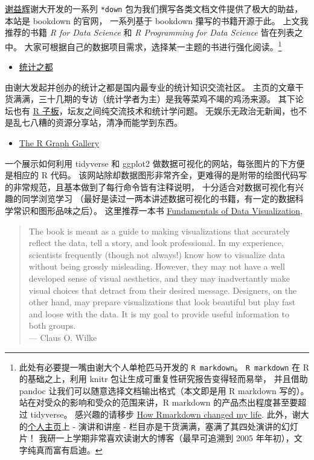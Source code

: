 \documentclass[11pt,hyperref]{ctexart}
\providecommand{\tightlist}{%
  \setlength{\itemsep}{0pt}\setlength{\parskip}{0pt}}
\begin{document}
\href{https://yihui.org/}{谢益辉}谢大开发的一系列 \texttt{*down}
包为我们撰写各类文档文件提供了极大的助益，本站是 bookdown 的官网，
一系列基于 bookdown 攥写的书籍开源于此。 上文我推荐的书籍 \emph{R for
Data Science} 和 \emph{R Programming for Data Science} 皆在列表之中。
大家可根据自己的数据项目需求，选择某一主题的书进行强化阅读。\footnote{此处有必要提一嘴由谢大个人单枪匹马开发的
  \texttt{R\ markdown}。 \texttt{R\ markdown} 在 R 的基础之上，利用
  knitr 包让生成可重复性研究报告变得轻而易举， 并且借助 pandoc
  让我们可以随意选择文档输出格式（本文即是用 R markdown 写的）。
  站在对受众的影响和受众的范围来讲，R markdown 的产品杰出程度甚至要超过
  tidyverse。 感兴趣的请移步
  \href{https://robjhyndman.com/seminars/rmarkdown/}{How Rmarkdown
  changed my life}. 此外，谢大的\href{https://yihui.org/}{个人主页}上 -
  演讲和讲座 - 栏目亦是干货满满，塞满了其四处演讲的幻灯片！
  我研一上学期非常喜欢读谢大的博客（最早可追溯到 2005
  年年初），文字纯真而富有启迪。}

\begin{itemize}
\tightlist
\item
  \href{https://cosx.org/}{统计之都}
\end{itemize}

由谢大发起并创办的统计之都是国内最专业的统计知识交流社区。
主页的文章干货满满，三十几期的专访（统计学者为主）是我等菜鸡不竭的鸡汤来源。
其下论坛也有 \href{https://d.cosx.org/t/r}{R
子板}，坛友之间纯交流技术和统计学问题。
无娱乐无政治无新闻，也不是乱七八糟的资源分享站，清净而能学到东西。

\begin{itemize}
\tightlist
\item
  \href{https://www.r-graph-gallery.com/index.html}{The R Graph Gallery}
\end{itemize}

一个展示如何利用 tidyverse 和 ggplot2
做数据可视化的网站，每张图片的下方便是相应的 R 代码。
该网站除却数据图形非常齐全，更难得的是附带的绘图代码写的非常规范，且基本做到了每行命令皆有注释说明，
十分适合对数据可视化有兴趣的同学浏览学习
（最好是读过一两本讲述数据可视化的书籍，有一定的数据科学常识和图形品味之后）。
这里推荐一本书 \href{https://serialmentor.com/dataviz/}{Fundamentals of
Data Visualization},

\begin{quote}
The book is meant as a guide to making visualizations that accurately
reflect the data, tell a story, and look professional. In my experience,
scientists frequently (though not always!) know how to visualize data
without being grossly misleading. However, they may not have a well
developed sense of visual aesthetics, and they may inadvertantly make
visual choices that detract from their desired message. Designers, on
the other hand, may prepare visualizations that look beautiful but play
fast and loose with the data. It is my goal to provide useful
information to both groups.\\
--- Claus O. Wilke
\end{quote}
\end{document}
